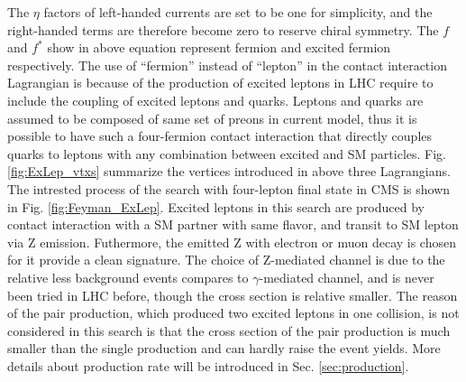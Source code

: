 \noindent The $\eta$ factors of left-handed currents are set to be one for simplicity, and the right-handed terms are therefore become zero to reserve chiral symmetry\cite{Norm}. The $f$ and $f^{*}$ show in above equation represent fermion and excited fermion respectively. The use of ``fermion'' instead of ``lepton'' in the contact interaction Lagrangian is because of the production of excited leptons in LHC require to include the coupling of excited leptons and quarks. Leptons and quarks are assumed to be composed of same set of preons in current model, thus it is possible to have such a four-fermion contact interaction that directly couples quarks to leptons with any combination between excited and SM particles.
\newline Fig. \ref{fig:ExLep_vtxs} summarize the vertices introduced in above three Lagrangians. The intrested process of the search with four-lepton final state in CMS is shown in Fig. \ref{fig:Feyman_ExLep}. Excited leptons in this search are produced by contact interaction with a SM partner with same flavor, and transit to SM lepton via Z emission. Futhermore, the emitted Z with electron or muon decay is chosen for it provide a clean signature. The choice of Z-mediated channel is due to the relative less background events compares to $\gamma$-mediated channel, and is never been tried in LHC before, though the cross section is relative smaller. The reason of the pair production, which produced two excited leptons in one collision, is not considered in this search is that the cross section of the pair production is much smaller than the single production and can hardly raise the event yields. More details about production rate will be introduced in Sec. \ref{sec:production}.
